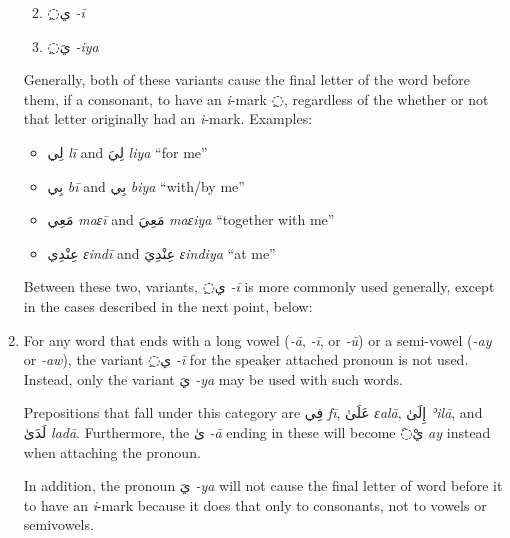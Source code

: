 \documentclass[
  10pt,
]{book}
\providecommand{\tightlist}{%
  \setlength{\itemsep}{0pt}\setlength{\parskip}{0pt}}
\begin{document}
\begin{enumerate}
  \begin{enumerate}
  \def\labelenumii{\roman{enumii}.}
  \tightlist
  \item
    \foreignlanguage{arabic}{◌ِي} \emph{-ī}
  \item
    \foreignlanguage{arabic}{◌ِيَ} \emph{-iya}
  \end{enumerate}

  Generally, both of these variants cause the final letter of the word before them, if a consonant, to have an \emph{i}-mark \foreignlanguage{arabic}{◌ِ}, regardless of the whether or not that letter originally had an \emph{i}-mark. Examples:

  \begin{itemize}
  \tightlist
  \item
    \foreignlanguage{arabic}{لِي} \emph{lī} and \foreignlanguage{arabic}{لِيَ} \emph{liya} \enquote{for me}
  \item
    \foreignlanguage{arabic}{بِي} \emph{bī} and \foreignlanguage{arabic}{بِي} \emph{biya} \enquote{with/by me}
  \item
    \foreignlanguage{arabic}{مَعِي} \emph{maɛī} and \foreignlanguage{arabic}{مَعِيَ} \emph{maɛiya} \enquote{together with me}
  \item
    \foreignlanguage{arabic}{عِنْدِي} \emph{ɛindī} and \foreignlanguage{arabic}{عِنْدِيَ} \emph{ɛindiya} \enquote{at me}
  \end{itemize}

  Between these two, variants, \foreignlanguage{arabic}{◌ِي} \emph{-ī} is more commonly used generally, except in the cases described in the next point, below:
\item
  For any word that ends with a long vowel (\emph{-ā}, \emph{-ī}, or \emph{-ū}) or a semi-vowel (\emph{-ay} or \emph{-aw}), the variant \foreignlanguage{arabic}{◌ِي} \emph{-ī} for the speaker attached pronoun is not used. Instead, only the variant \foreignlanguage{arabic}{يَ} \emph{-ya} may be used with such words.

  Prepositions that fall under this category are \foreignlanguage{arabic}{فِي} \emph{fī}, \foreignlanguage{arabic}{عَلَىٰ} \emph{ɛalā}, \foreignlanguage{arabic}{إِلَىٰ} \emph{ʾilā}, and \foreignlanguage{arabic}{لَدَىٰ} \emph{ladā}. Furthermore, the \foreignlanguage{arabic}{ىٰ} \emph{-ā} ending in these will become \foreignlanguage{arabic}{◌َيْ} \emph{ay} instead when attaching the pronoun.

  In addition, the pronoun \foreignlanguage{arabic}{يَ} \emph{-ya} will not cause the final letter of word before it to have an \emph{i}-mark because it does that only to consonants, not to vowels or semivowels.


\end{enumerate}
\end{document}
